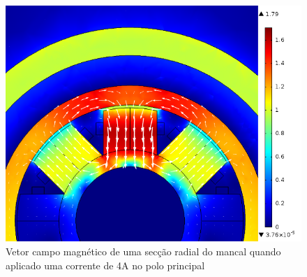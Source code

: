 \begin{figure}
\centering
\includegraphics[width=0.8\linewidth]{Figs/Simulacoes/Ativo/Cima_dx=03_I=4}
\caption{Vetor campo magnético de uma secção radial do mancal quando aplicado uma corrente de 4A no polo principal}
\label{fig:ativo:fem:b:radial}
\end{figure}



%


